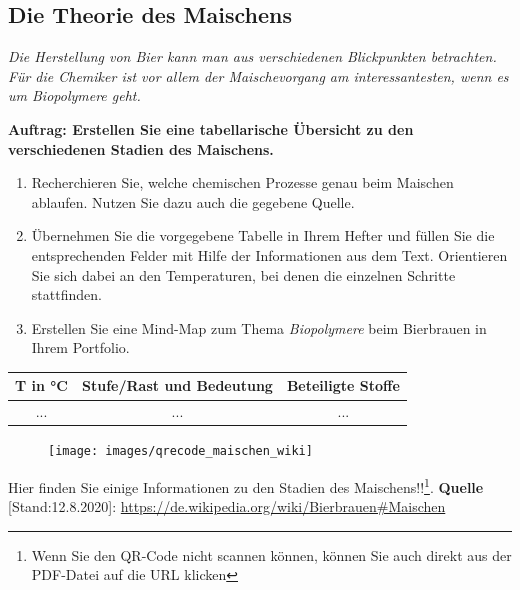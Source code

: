 \documentclass{scrartcl}  %
\begin{document}
		\subsection{Die Theorie des Maischens}
		
			\textit{Die Herstellung von Bier kann man aus verschiedenen Blickpunkten betrachten. Für die Chemiker ist vor allem der Maischevorgang am interessantesten, wenn es um Biopolymere geht.} \newline

			\noindent \textbf{Auftrag: Erstellen Sie eine tabellarische Übersicht zu den verschiedenen Stadien des	 Maischens.}
			\begin{enumerate}
				\item Recherchieren Sie, welche chemischen Prozesse genau beim Maischen ablaufen. Nutzen Sie dazu auch die gegebene Quelle.
				\item Übernehmen Sie die vorgegebene Tabelle in Ihrem Hefter und füllen Sie die entsprechenden Felder mit Hilfe der Informationen aus dem Text. Orientieren Sie sich dabei an den Temperaturen, bei denen die einzelnen Schritte stattfinden.
				\item Erstellen Sie eine Mind-Map zum Thema \textit{Biopolymere} beim Bierbrauen in Ihrem Portfolio.
			\end{enumerate}
			
			\begin{center}
				\begin{tabular}{|c|c|c|}
					\hline
					T in °C & Stufe/Rast und Bedeutung & Beteiligte Stoffe \\
					\hline
					... & ... & ... \\
					\hline
				\end{tabular}
			\end{center}
			
\vspace{0.3cm}
			\begin{tcolorbox}[enhanced,
				colback=white,
				colframe=black,
				fonttitle=\sffamily\bfseries\large, 
				title=Informationen zum Maischen,  %
				attach boxed title to top left={xshift=3.2mm,yshift=-0.50mm},
				boxed title style={skin=enhancedfirst jigsaw,size=small,arc=1mm,bottom=-1mm,colframe=black,height=0.75cm},
				colbacktitle=black,
				drop lifted shadow]
				\begin{figure}  
					\centering
					\vspace{-14pt}  %
					\texttt{[image: images/qrecode\_maischen\_wiki]}
				\end{figure}
				
					Hier finden Sie einige Informationen zu den Stadien des Maischens!!\footnote{Wenn Sie den QR-Code nicht scannen können, können Sie auch direkt aus der PDF-Datei auf die URL klicken}. \newline
					\textbf{Quelle} [Stand:12.8.2020]: \newline 
					\url{https://de.wikipedia.org/wiki/Bierbrauen#Maischen}
				\vspace{1.0cm}  %
			\end{tcolorbox}
\end{document}
